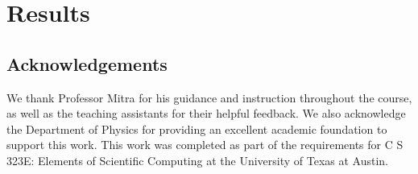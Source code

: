 \documentclass[linenumbers, RNAAS, trackchanges]{aastex631}
\begin{document}
\section{Results} \label{sec:results}



\subsection{Acknowledgements}
We thank Professor Mitra for his guidance and instruction throughout the course,
as well as the teaching assistants for their helpful feedback. We also
acknowledge the Department of Physics for providing an excellent academic foundation 
to support this work. This work was completed as part of the requirements for 
C S 323E: Elements of Scientific Computing at the University of Texas at Austin.

\newpage


\end{document}

